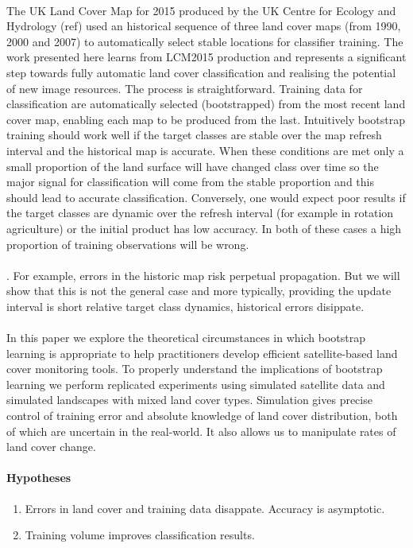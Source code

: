 \paragraph{}The UK Land Cover Map for 2015 produced by the UK Centre for Ecology and Hydrology (ref) used an historical sequence of three land cover maps (from 1990, 2000 and 2007) to automatically select stable locations for classifier training.  The work presented here learns from LCM2015 production and represents a significant step towards fully automatic land cover classification and realising the potential of new image resources.  The process is straightforward.  Training data for classification are automatically selected (bootstrapped) from the most recent land cover map, enabling each map to be produced from the last.  Intuitively bootstrap training should work well if the target classes are stable over the map refresh interval and the historical map is accurate.  When these conditions are met only a small proportion of the land surface will have changed class over time so the major signal for classification will come from the stable proportion and this should lead to accurate classification. Conversely, one would expect poor results if the target classes are dynamic over the refresh interval (for example in rotation agriculture) or the initial product has low accuracy.  In both of these cases a high proportion of training observations will be wrong.  

\paragraph{}.   For example, errors in the historic map risk perpetual propagation.  But we will show that this is not the general case and more typically, providing the update interval is short relative target class dynamics, historical errors disippate.   
\paragraph{}

\paragraph{}
In this paper we explore the theoretical circumstances in which bootstrap learning is appropriate to help practitioners develop efficient satellite-based land cover monitoring tools.  To properly understand the implications of bootstrap learning we perform replicated experiments using simulated satellite data and simulated landscapes with mixed land cover types.  Simulation gives precise control of training error and absolute knowledge of land cover distribution, both of which are uncertain in the real-world. It also allows us to manipulate rates of land cover change.  

\paragraph{Hypotheses}
\begin{enumerate}
	\item Errors in land cover and training data disappate.  Accuracy is asymptotic.
	\item Training volume improves classification results.
\end{enumerate}
 

